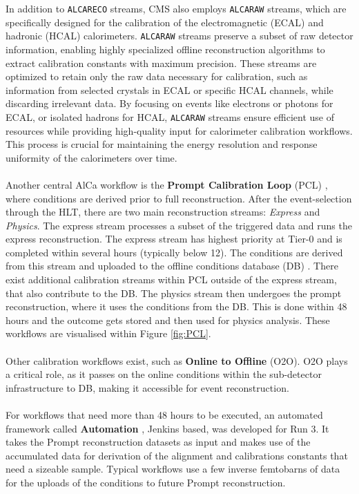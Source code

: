 In addition to \texttt{ALCARECO} streams, CMS also employs \texttt{ALCARAW} streams, which are specifically designed for the calibration of the electromagnetic (ECAL) and hadronic (HCAL) calorimeters. \texttt{ALCARAW} streams preserve a subset of raw detector information, enabling highly specialized offline reconstruction algorithms to extract calibration constants with maximum precision. 
These streams are optimized to retain only the raw data necessary for calibration, such as information from selected crystals in ECAL or specific HCAL channels, while discarding irrelevant data. By focusing on events like electrons or photons for ECAL, or isolated hadrons for HCAL, \texttt{ALCARAW} streams ensure efficient use of resources while providing high-quality input for calorimeter calibration workflows. This process is crucial for maintaining the energy resolution and response uniformity of the calorimeters over time.\\ \\
Another central AlCa workflow is the \textbf{Prompt Calibration Loop} (PCL) \cite{David_Futyan_2010,Cerminara_2015}, where conditions are derived prior to full reconstruction. After the event-selection through the HLT, there are two main reconstruction streams: \textit{Express} and \textit{Physics}. The express stream processes a subset of the triggered data and runs the express reconstruction. The express stream has highest priority at Tier-0 and is completed within several hours (typically below 12). The conditions are derived from this stream and uploaded to the offline conditions database (DB) \cite{di2015cms}. There exist additional calibration streams within PCL outside of the express stream, that also contribute to the DB.
The physics stream then undergoes the prompt reconstruction, where it uses the conditions from the DB. This is done within 48 hours and the outcome gets stored and then used for physics analysis. These workflows are visualised within Figure \ref{fig:PCL}. 
\\ \\
Other calibration workflows exist, such as \textbf{Online to Offline} (O2O). O2O plays a critical role, as it passes on the online conditions within the sub-detector infrastructure to DB, making it accessible for event reconstruction.
\\ \\
For workflows that need more than 48 hours to be executed, an automated framework called \textbf{Automation} \cite{Pigazzini:2853679}, Jenkins based, was developed for Run 3. It takes the Prompt reconstruction datasets as input and makes use of the accumulated data for derivation of the alignment and calibrations constants that need a sizeable sample. Typical workflows use a few inverse femtobarns of data for the uploads of the conditions to future Prompt reconstruction.  

